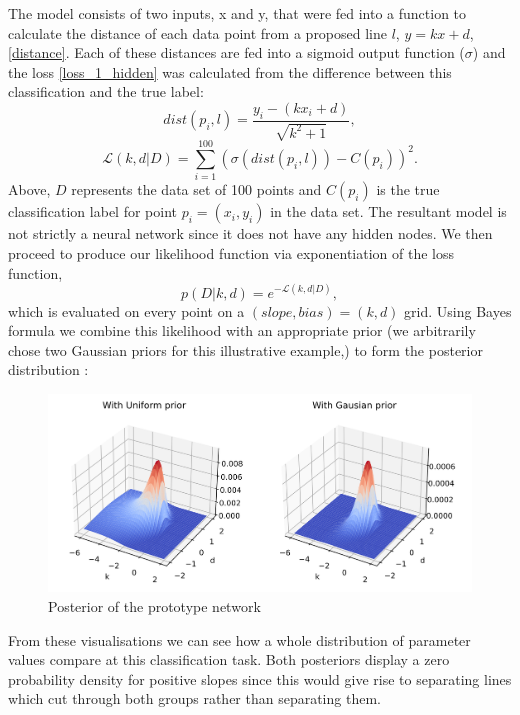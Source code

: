\documentclass[review]{siamart190516}
\begin{document}
 The model consists of two inputs, x and y, that were fed into a function to calculate the distance of each data point from a proposed line $l$, $y=kx+d$, \ref{distance}. Each of these distances are fed into a sigmoid output function ($\sigma$) and the loss \ref{loss_1_hidden} was calculated from the difference between this classification and the true label:
 \begin{equation}
    dist(p_{i},l) = \frac{y_{i}-\left(k x_{i}+d\right)}{\sqrt{k^{2}+1}},
    \label{distance}
 \end{equation}
\begin{equation}
    \mathcal{L}(k,d|D) = \sum_{i=1}^{100}\left(  \sigma(dist(p_{i},l)) - C(p_{i}) \right)^{2}.
    \label{loss_1_hidden}
    \end{equation}
Above, $D$ represents the data set of 100 points and $C(p_{i})$ is the true classification label for point $p_{i}=(x_{i},y_{i})$ in the data set.
The resultant model is not strictly a neural network since it does not have any hidden nodes.
\newline
We then proceed to produce our likelihood function via exponentiation of the loss function,
\begin{equation}
    p(D|k,d)=e^{-\mathcal{L}(k,d|D)},
\end{equation}
which is evaluated on every point on a $(slope, bias) = (k,d)$ grid.
Using Bayes formula we combine this likelihood  with an appropriate prior (we arbitrarily chose two Gaussian priors for this illustrative example,) to form the posterior distribution :
\begin{figure}[h!]
    \centering
    \includegraphics[width = \textwidth]{Images/posterior.png}
    \caption{Posterior of the prototype network}
    \label{fig:post}
\end{figure}
From these visualisations we can see how a whole distribution of parameter values compare at this classification task. Both posteriors display a zero probability density for positive slopes since this would give rise to separating lines which cut through both groups rather than separating them.
\end{document}
